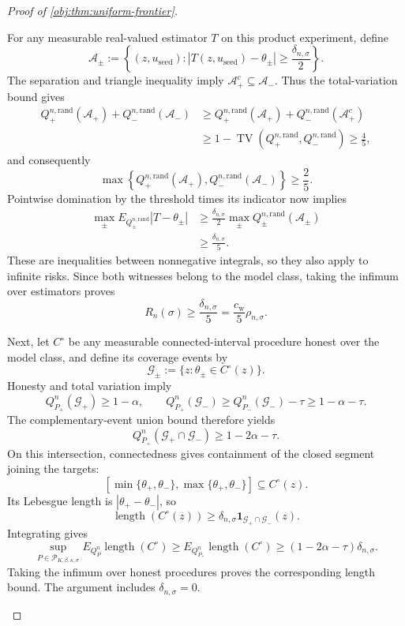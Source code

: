 \begin{proof}[Proof of \cref{obj:thm:uniform-frontier}]
\begin{enumerate}
For any measurable real-valued estimator \(T\) on this product experiment, define
\[
\mathcal A_\pm
:=
\left\{(z,u_{\mathrm{seed}}):
|T(z,u_{\mathrm{seed}})-\theta_\pm|
\ge\frac{\delta_{n,\sigma}}2\right\}.
\]
The separation and triangle inequality imply
\(\mathcal A_+^c\subseteq\mathcal A_-\). Thus the total-variation bound gives
\[
\begin{aligned}
Q_+^{n,\mathrm{rand}}(\mathcal A_+)
+Q_-^{n,\mathrm{rand}}(\mathcal A_-)
&\ge
Q_+^{n,\mathrm{rand}}(\mathcal A_+)
+Q_-^{n,\mathrm{rand}}(\mathcal A_+^c)\\
&\ge
1-\operatorname{TV}(Q_+^{n,\mathrm{rand}},Q_-^{n,\mathrm{rand}})
\ge\frac45,
\end{aligned}
\]
and consequently
\[
\max\left\{
Q_+^{n,\mathrm{rand}}(\mathcal A_+),
Q_-^{n,\mathrm{rand}}(\mathcal A_-)
\right\}\ge\frac25.
\]
Pointwise domination by the threshold times its indicator now implies
\[
\begin{aligned}
\max_{\pm}E_{Q_\pm^{n,\mathrm{rand}}}|T-\theta_\pm|
&\ge
\frac{\delta_{n,\sigma}}2
\max_{\pm}Q_\pm^{n,\mathrm{rand}}(\mathcal A_\pm)\\
&\ge\frac{\delta_{n,\sigma}}5.
\end{aligned}
\]
These are inequalities between nonnegative integrals, so they also apply to infinite risks. Since both witnesses belong to the model class, taking the infimum over estimators proves
\[
R_n(\sigma)\ge\frac{\delta_{n,\sigma}}5
=\frac{c_{\mathrm w}}5\rho_{n,\sigma}.
\]

Next, let \(C^\circ\) be any measurable connected-interval procedure honest over the model class, and define its coverage events by
\[
\mathcal G_\pm:=\{z:\theta_\pm\in C^\circ(z)\}.
\]
Honesty and total variation imply
\[
Q_{P_+}^n(\mathcal G_+)\ge1-\alpha,
\qquad
Q_{P_+}^n(\mathcal G_-)
\ge Q_{P_-}^n(\mathcal G_-)-\tau
\ge1-\alpha-\tau.
\]
The complementary-event union bound therefore yields
\[
Q_{P_+}^n(\mathcal G_+\cap\mathcal G_-)
\ge1-2\alpha-\tau.
\]
On this intersection, connectedness gives containment of the closed segment joining the targets:
\[
[\min\{\theta_+,\theta_-\},\max\{\theta_+,\theta_-\}]
\subseteq C^\circ(z).
\]
Its Lebesgue length is \(|\theta_+-\theta_-|\), so
\[
\operatorname{length}(C^\circ(z))
\ge
\delta_{n,\sigma}\mathbf1_{\mathcal G_+\cap\mathcal G_-}(z).
\]
Integrating gives
\[
\sup_{P\in\mathcal P_{K,\beta,\kappa,\sigma}}
E_{Q_P^n}\operatorname{length}(C^\circ)
\ge
E_{Q_{P_+}^n}\operatorname{length}(C^\circ)
\ge(1-2\alpha-\tau)\delta_{n,\sigma}.
\]
Taking the infimum over honest procedures proves the corresponding length bound. The argument includes \(\delta_{n,\sigma}=0\).


\end{enumerate}
\end{proof}
